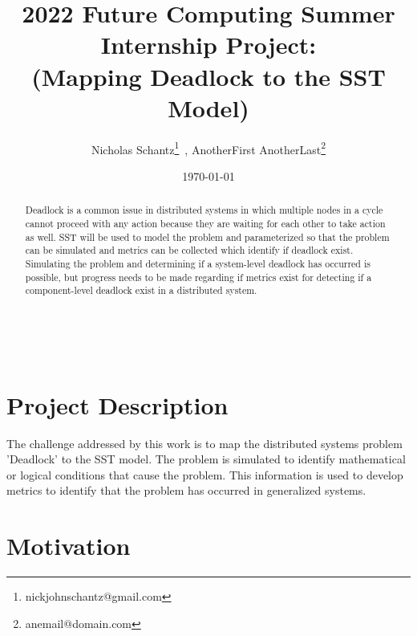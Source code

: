 \documentclass{article}
\begin{document}
    \begin{minipage}[h]{\textwidth}
        \title{2022 Future Computing Summer Internship Project:\\(Mapping Deadlock to the SST Model)}
        \author{Nicholas Schantz\footnote{nickjohnschantz@gmail.com}\ , 
        AnotherFirst AnotherLast\footnote{anemail@domain.com}}
        \date{\today}
            \maketitle
        \begin{abstract}
            Deadlock is a common issue in distributed systems in which multiple nodes in a cycle cannot proceed with any action because they are waiting for each other to take action as well. SST will be used to model the problem and parameterized so that the problem can be simulated and metrics can be collected which identify if deadlock exist. Simulating the problem and determining if a system-level deadlock has occurred is possible, but progress needs to be made regarding if metrics exist for detecting if a component-level deadlock exist in a distributed system.
        \end{abstract}
    \end{minipage}

\ \\


\section{Project Description} %

The challenge addressed by this work is to map the distributed systems problem 'Deadlock' to the SST model. The problem is simulated to identify mathematical or logical conditions that cause the problem. This information is used to develop metrics to identify that the problem has occurred in generalized systems.

\section{Motivation} %
\end{document}
